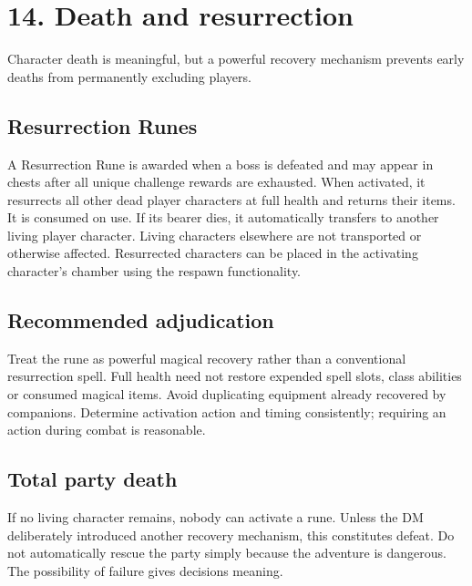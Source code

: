 \section{14. Death and resurrection}

Character death is meaningful, but a powerful recovery mechanism prevents early deaths from permanently excluding players.

\subsection{Resurrection Runes}

A Resurrection Rune is awarded when a boss is defeated and may appear in chests after all unique challenge rewards are exhausted. When activated, it resurrects all other dead player characters at full health and returns their items. It is consumed on use. If its bearer dies, it automatically transfers to another living player character. Living characters elsewhere are not transported or otherwise affected. Resurrected characters can be placed in the activating character's chamber using the respawn functionality.

\subsection{Recommended adjudication}

Treat the rune as powerful magical recovery rather than a conventional resurrection spell. Full health need not restore expended spell slots, class abilities or consumed magical items. Avoid duplicating equipment already recovered by companions. Determine activation action and timing consistently; requiring an action during combat is reasonable.

\subsection{Total party death}

If no living character remains, nobody can activate a rune. Unless the DM deliberately introduced another recovery mechanism, this constitutes defeat. Do not automatically rescue the party simply because the adventure is dangerous. The possibility of failure gives decisions meaning.

